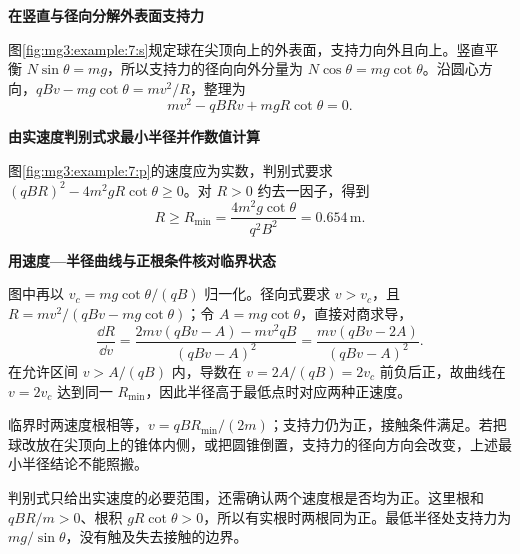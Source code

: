 \begin{solution}\textbf{在竖直与径向分解外表面支持力}\par\nobreak
图\ref{fig:mg3:example:7:s}规定球在尖顶向上的外表面，支持力向外且向上。竖直平衡 $N\sin\theta=mg$，所以支持力的径向向外分量为 $N\cos\theta=mg\cot\theta$。沿圆心方向，$qBv-mg\cot\theta=mv^2/R$，整理为
\[
mv^2-qBRv+mgR\cot\theta=0.
\]



\par\medskip{}\noindent\textbf{由实速度判别式求最小半径并作数值计算}\par\nobreak
图\ref{fig:mg3:example:7:p}的速度应为实数，判别式要求 $(qBR)^2-4m^2gR\cot\theta\ge0$。对 $R>0$ 约去一因子，得到
\[
R\ge R_{\min}=\frac{4m^2g\cot\theta}{q^2B^2}=0.654\,\mathrm m.
\]


\par\medskip{}\noindent\textbf{用速度—半径曲线与正根条件核对临界状态}\par\nobreak
图中再以 $v_c=mg\cot\theta/(qB)$ 归一化。径向式要求 $v>v_c$，且 $R=mv^2/(qBv-mg\cot\theta)$；令 $A=mg\cot\theta$，直接对商求导，
\[
 \frac{\dd R}{\dd v}
 =\frac{2mv(qBv-A)-mv^2qB}{(qBv-A)^2}
 =\frac{mv(qBv-2A)}{(qBv-A)^2}.
\]
在允许区间 $v>A/(qB)$ 内，导数在 $v=2A/(qB)=2v_c$ 前负后正，故曲线在 $v=2v_c$ 达到同一 $R_{\min}$，因此半径高于最低点时对应两种正速度。



临界时两速度根相等，$v=qBR_{\min}/(2m)$；支持力仍为正，接触条件满足。若把球改放在尖顶向上的锥体内侧，或把圆锥倒置，支持力的径向方向会改变，上述最小半径结论不能照搬。

判别式只给出实速度的必要范围，还需确认两个速度根是否均为正。这里根和 $qBR/m>0$、根积 $gR\cot\theta>0$，所以有实根时两根同为正。最低半径处支持力为 $mg/\sin\theta$，没有触及失去接触的边界。\end{solution}
